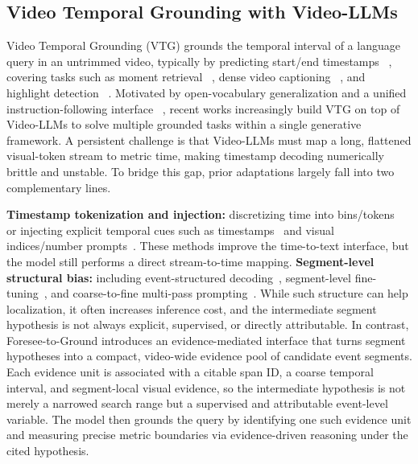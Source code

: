 \documentclass{article}
\theoremstyle{plain}
\theoremstyle{definition}
\theoremstyle{remark}
\begin{document}
\subsection{Video Temporal Grounding with Video-LLMs}

Video Temporal Grounding (VTG) grounds the temporal interval of a language query in an untrimmed video, typically by predicting start/end timestamps ~\cite{vtg2,vtg1,tea,interventional,llava-st}, covering tasks such as moment retrieval ~\cite{VMR,xu2022meta,foo2023system,hierarchical,frame,grounded}, dense video captioning ~\cite{activitynet_captions,vid2seq,person_search_survey,kim2024you}, and highlight detection ~\cite{qvhighlights,TimeChat}.
Motivated by open-vocabulary generalization and a unified instruction-following interface ~\cite{LLaVA-OneVision,LLaVA,Qwen2-VL,yi2024bridge,LLaVA-Video}, recent works increasingly build VTG on top of Video-LLMs to solve multiple grounded tasks within a single generative framework.
A persistent challenge is that Video-LLMs must map a long, flattened visual-token stream to metric time, making timestamp decoding numerically brittle and unstable.
To bridge this gap, prior adaptations largely fall into two complementary lines.

\textbf{Timestamp tokenization and injection:} discretizing time into bins/tokens~\cite{Momentor,TRACE} or injecting explicit temporal cues such as timestamps~\cite{VTimeLLM,TimeChat,TimeSuite} and visual indices/number prompts~\cite{NumPro}.
These methods improve the time-to-text interface, but the model still performs a direct stream-to-time mapping.
\textbf{Segment-level structural bias:} including event-structured decoding~\cite{TRACE}, segment-level fine-tuning~\cite{SF2T}, and coarse-to-fine multi-pass prompting~\cite{slowfocus}.
While such structure can help localization, it often increases inference cost, and the intermediate segment hypothesis is not always explicit, supervised, or directly attributable.
In contrast, Foresee-to-Ground introduces an evidence-mediated interface that turns segment hypotheses into a compact, video-wide evidence pool of candidate event segments.
Each evidence unit is associated with a citable span ID, a coarse temporal interval, and segment-local visual evidence, so the intermediate hypothesis is not merely a narrowed search range but a supervised and attributable event-level variable.
The model then grounds the query by identifying one such evidence unit and measuring precise metric boundaries via evidence-driven reasoning under the cited hypothesis.
\end{document}
